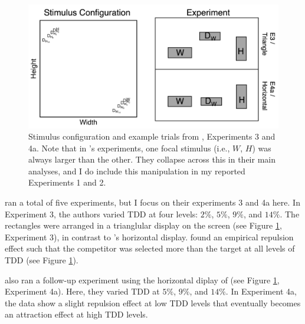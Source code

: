 \documentclass{umassthesis}          %
\begin{document}
\begin{figure}
   \includegraphics[width=\linewidth]{figures/spektor_stim.png}
   \caption{Stimulus configuration and example trials from \textcite{spektorWhenGoodLooks2018b}, Experiments 3 and 4a. Note that in \textcite{spektorWhenGoodLooks2018b}'s experiments, one focal stimulus (i.e., $W$, $H$) was always larger than the other. They collapse across this in their main analyses, and I do include this manipulation in my reported Experiments 1 and 2.}
   \label{fig:spektor_stim}
\end{figure}

\textcite{spektorWhenGoodLooks2018b} ran a total of five experiments, but I focus on their experiments 3 and 4a here. In Experiment 3, the authors varied TDD at four levels: $2\%$, $5\%$, $9\%$, and $14\%$. The rectangles were arranged in a trianglular display on the screen (see Figure \ref{fig:spektor_stim}, Experiment 3), in contrast to \textcite{trueblood2013not}'s horizontal display. \textcite{spektorWhenGoodLooks2018b} found an empirical repulsion effect such that the competitor was selected more than the target at all levels of TDD (see Figure \ref{fig:spektor_stim}). 

\textcite{spektorWhenGoodLooks2018b} also ran a follow-up experiment using the horizontal diplay of \textcite{trueblood2013not} (see Figure \ref{fig:spektor_stim}, Experiment 4a). Here, they varied TDD at $5\%$, $9\%$, and $14\%$. In Experiment 4a, the data show a slight repulsion effect at low TDD levels that eventually becomes an attraction effect at high TDD levels. 
\end{document}
